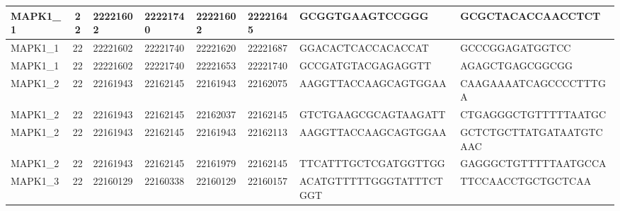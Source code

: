 \begin{landscape}
\begin{longtable}{| p{} | p{} | p{} | p{} | p{} | p{} | p{} | p{} |}
\multicolumn{1}{|l|}{MAPK1\_1}   & \multicolumn{1}{c|}{22} & \multicolumn{1}{l|}{22221602}  & \multicolumn{1}{l|}{22221740}  & \multicolumn{1}{l|}{22221602}  & \multicolumn{1}{l|}{22221645}  & \multicolumn{1}{l|}{GCGGTGAAGTCCGGG}                 & \multicolumn{1}{l|}{GCGCTACACCAACCTCT}             \\ \hline
\multicolumn{1}{|l|}{MAPK1\_1}   & \multicolumn{1}{c|}{22} & \multicolumn{1}{l|}{22221602}  & \multicolumn{1}{l|}{22221740}  & \multicolumn{1}{l|}{22221620}  & \multicolumn{1}{l|}{22221687}  & \multicolumn{1}{l|}{GGACACTCACCACACCAT}              & \multicolumn{1}{l|}{GCCCGGAGATGGTCC}               \\ \hline
\multicolumn{1}{|l|}{MAPK1\_1}   & \multicolumn{1}{c|}{22} & \multicolumn{1}{l|}{22221602}  & \multicolumn{1}{l|}{22221740}  & \multicolumn{1}{l|}{22221653}  & \multicolumn{1}{l|}{22221740}  & \multicolumn{1}{l|}{GCCGATGTACGAGAGGTT}              & \multicolumn{1}{l|}{AGAGCTGAGCGGCGG}               \\ \hline
\multicolumn{1}{|l|}{MAPK1\_2}   & \multicolumn{1}{c|}{22} & \multicolumn{1}{l|}{22161943}  & \multicolumn{1}{l|}{22162145}  & \multicolumn{1}{l|}{22161943}  & \multicolumn{1}{l|}{22162075}  & \multicolumn{1}{l|}{AAGGTTACCAAGCAGTGGAA}            & \multicolumn{1}{l|}{CAAGAAAATCAGCCCCTTTGA}         \\ \hline
\multicolumn{1}{|l|}{MAPK1\_2}   & \multicolumn{1}{c|}{22} & \multicolumn{1}{l|}{22161943}  & \multicolumn{1}{l|}{22162145}  & \multicolumn{1}{l|}{22162037}  & \multicolumn{1}{l|}{22162145}  & \multicolumn{1}{l|}{GTCTGAAGCGCAGTAAGATT}            & \multicolumn{1}{l|}{CTGAGGGCTGTTTTTAATGC}          \\ \hline
\multicolumn{1}{|l|}{MAPK1\_2}   & \multicolumn{1}{c|}{22} & \multicolumn{1}{l|}{22161943}  & \multicolumn{1}{l|}{22162145}  & \multicolumn{1}{l|}{22161943}  & \multicolumn{1}{l|}{22162113}  & \multicolumn{1}{l|}{AAGGTTACCAAGCAGTGGAA}            & \multicolumn{1}{l|}{GCTCTGCTTATGATAATGTCAAC}       \\ \hline
\multicolumn{1}{|l|}{MAPK1\_2}   & \multicolumn{1}{c|}{22} & \multicolumn{1}{l|}{22161943}  & \multicolumn{1}{l|}{22162145}  & \multicolumn{1}{l|}{22161979}  & \multicolumn{1}{l|}{22162145}  & \multicolumn{1}{l|}{TTCATTTGCTCGATGGTTGG}            & \multicolumn{1}{l|}{GAGGGCTGTTTTTAATGCCA}          \\ \hline
\multicolumn{1}{|l|}{MAPK1\_3}   & \multicolumn{1}{c|}{22} & \multicolumn{1}{l|}{22160129}  & \multicolumn{1}{l|}{22160338}  & \multicolumn{1}{l|}{22160129}  & \multicolumn{1}{l|}{22160157}  & \multicolumn{1}{l|}{ACATGTTTTTGGGTATTTCTGGT}         & \multicolumn{1}{l|}{TTCCAACCTGCTGCTCAA}            \\ \hline

\end{longtable}
\end{landscape}
